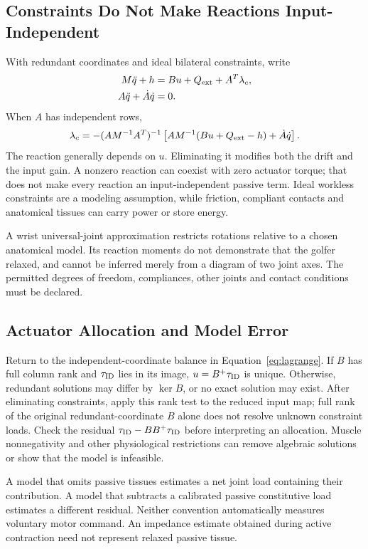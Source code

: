 \documentclass[11pt,a4paper]{article}
\begin{document}
\subsection{Constraints Do Not Make Reactions Input-Independent}
With redundant coordinates and ideal bilateral constraints, write
\begin{align}
M\ddot q+h&=Bu+Q_{\rm ext}+A^T\lambda_c,\\
A\ddot q+\dot A\dot q&=0.
\end{align}
When $A$ has independent rows,
\begin{equation}
\lambda_c=-(AM^{-1}A^T)^{-1}
\left[AM^{-1}(Bu+Q_{\rm ext}-h)+\dot A\dot q\right].
\end{equation}
The reaction generally depends on $u$. Eliminating it modifies both the drift and the input gain. A nonzero reaction can coexist with zero actuator torque; that does not make every reaction an input-independent passive term. Ideal workless constraints are a modeling assumption, while friction, compliant contacts and anatomical tissues can carry power or store energy.

A wrist universal-joint approximation restricts rotations relative to a chosen anatomical model. Its reaction moments do not demonstrate that the golfer relaxed, and cannot be inferred merely from a diagram of two joint axes. The permitted degrees of freedom, compliances, other joints and contact conditions must be declared.

\subsection{Actuator Allocation and Model Error}
Return to the independent-coordinate balance in Equation~\ref{eq:lagrange}. If $B$ has full column rank and $\tau_{\rm ID}$ lies in its image, $u=B^+\tau_{\rm ID}$ is unique. Otherwise, redundant solutions may differ by $\ker B$, or no exact solution may exist. After eliminating constraints, apply this rank test to the reduced input map; full rank of the original redundant-coordinate $B$ alone does not resolve unknown constraint loads. Check the residual $\tau_{\rm ID}-BB^+\tau_{\rm ID}$ before interpreting an allocation. Muscle nonnegativity and other physiological restrictions can remove algebraic solutions or show that the model is infeasible.

A model that omits passive tissues estimates a net joint load containing their contribution. A model that subtracts a calibrated passive constitutive load estimates a different residual. Neither convention automatically measures voluntary motor command. An impedance estimate obtained during active contraction need not represent relaxed passive tissue.
\end{document}
